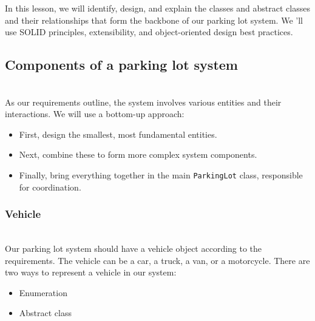 

In this lesson, we will identify, design, and explain the classes and abstract classes and their relationships that form the backbone of our parking lot system. We 'll use SOLID principles, extensibility, and object-oriented design best practices.

\subsection{Components of a parking lot system}\label{3U1e8cD3M4xGVCXTeJbJ1}
\\
As our requirements outline, the system involves various entities and their interactions. We will use a bottom-up approach:

\begin{itemize}
\item
\protect{}\label{ruKsU6jrcWBIyY8UjIF94}
First, design the smallest, most fundamental entities.
\item
\protect{}\label{Go0Gqn6TX_npG1adTj9tp}
Next, combine these to form more complex system components.
\item
\protect{}\label{vZY2IExRQNQXtMmPVV6Kq}
Finally, bring everything together in the main \texttt{ParkingLot} class, responsible for coordination.
\end{itemize}

\subsubsection{Vehicle}\label{PBFiZdprecXihr7jm9hSC}
\\
Our parking lot system should have a vehicle object according to the requirements. The vehicle can be a car, a truck, a van, or a motorcycle. There are two ways to represent a vehicle in our system:

\begin{itemize}
\item
\protect{}\label{737wfNLXKdkJp6YE5g5m2}
Enumeration
\item
\protect{}\label{xud_hjjAi1QZcDZtGA_lU}
Abstract class
\end{itemize}
\\
